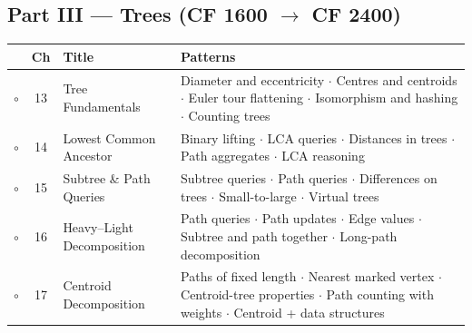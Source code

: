 \subsection*{Part III --- Trees (CF 1600 $\to$ CF 2400)}
\begin{tabularx}{\linewidth}{@{}c c >{\raggedright\arraybackslash}p{3.6cm} X@{}}
\toprule
& \textbf{Ch} & \textbf{Title} & \textbf{Patterns} \\
\midrule
$\circ$ & 13 & Tree Fundamentals & Diameter and eccentricity $\cdot$ Centres and centroids $\cdot$ Euler tour flattening $\cdot$ Isomorphism and hashing $\cdot$ Counting trees \\
$\circ$ & 14 & Lowest Common Ancestor & Binary lifting $\cdot$ LCA queries $\cdot$ Distances in trees $\cdot$ Path aggregates $\cdot$ LCA reasoning \\
$\circ$ & 15 & Subtree \& Path Queries & Subtree queries $\cdot$ Path queries $\cdot$ Differences on trees $\cdot$ Small-to-large $\cdot$ Virtual trees \\
$\circ$ & 16 & Heavy--Light Decomposition & Path queries $\cdot$ Path updates $\cdot$ Edge values $\cdot$ Subtree and path together $\cdot$ Long-path decomposition \\
$\circ$ & 17 & Centroid Decomposition & Paths of fixed length $\cdot$ Nearest marked vertex $\cdot$ Centroid-tree properties $\cdot$ Path counting with weights $\cdot$ Centroid + data structures \\
\bottomrule
\end{tabularx}

